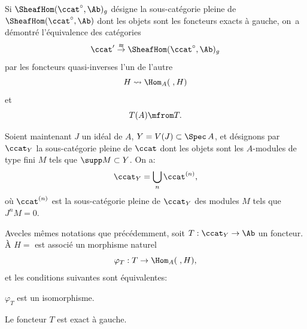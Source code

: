 Si $\SheafHom (\ccat^{\circ}, \Ab)_{g}$ d\'esigne la sous-cat\'egorie pleine de $\SheafHom (\ccat^{\circ}, \Ab)$ dont les objets sont les foncteurs exacts \`a gauche, on~a d\'emontr\'e l'\'equivalence des cat\'egories
\[
\ccat' \overset{\thickapprox}{\to} \SheafHom (\ccat^{\circ}, \Ab)_{g}
\]
par les foncteurs quasi-inverses l'un de l'autre
\[
H \rightsquigarrow\Hom_{A}(\;, H)
\]
et
\[
T(A) \mfrom T.
\]

Soient maintenant $J$ un id\'eal de $A$, $Y=V(J)\subset \Spec\, A$, et d\'esignons par $\ccat_{Y}$ la sous-cat\'egorie pleine de $\ccat$ dont les objets sont les $A$-modules de type fini $M$ tels que $\supp M\subset Y$. On a:
\[
\ccat_{Y}=\bigcup_{n}\ccat^{(n)},
\]
o\`u $\ccat^{(n)}$ est la sous-cat\'egorie pleine de $\ccat_{Y}$ des modules $M$ tels que $J^{n}M=0$.

\begin{proposition} \label{IV.1.3}
Avec\pageoriginale les m\^emes notations que pr\'ec\'edemment, soit $T:\ccat_{Y}\to \Ab$ un foncteur. \`A $H=$ est associ\'e un morphisme naturel
\[
\varphi_{T}: T\to \Hom_{A}(\;, H),
\]
et les conditions suivantes sont \'equivalentes:
\begin{enumeratei}
\item
$\varphi_{T}$ est un isomorphisme.

\item
Le foncteur $T$ est exact \`a gauche.
\end{enumeratei}
\end{proposition}

